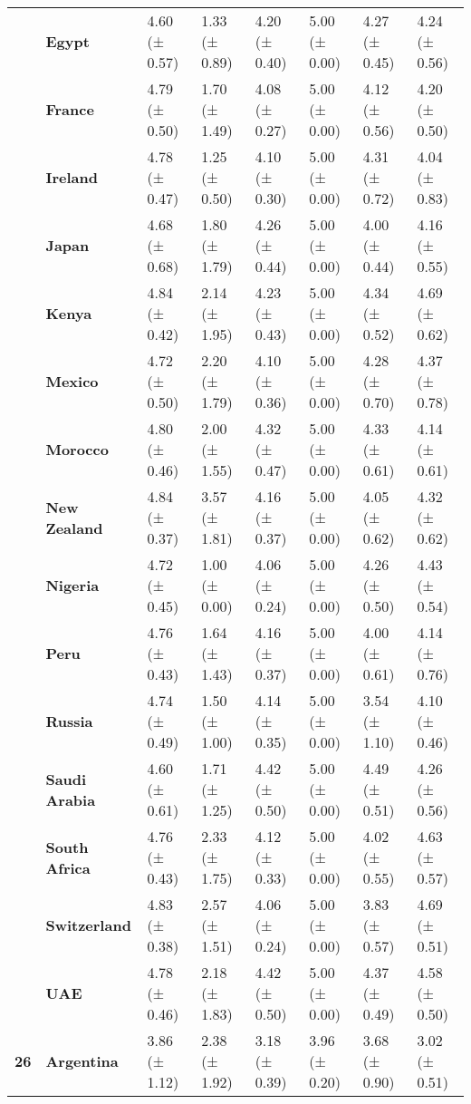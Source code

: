 \begin{longtable}{llllllll}
\textbf{} & \textbf{Egypt} & 4.60 (± 0.57) & 1.33 (± 0.89) & 4.20 (± 0.40) & 5.00 (± 0.00) & 4.27 (± 0.45) & 4.24 (± 0.56) \\
\textbf{} & \textbf{France} & 4.79 (± 0.50) & 1.70 (± 1.49) & 4.08 (± 0.27) & 5.00 (± 0.00) & 4.12 (± 0.56) & 4.20 (± 0.50) \\
\textbf{} & \textbf{Ireland} & 4.78 (± 0.47) & 1.25 (± 0.50) & 4.10 (± 0.30) & 5.00 (± 0.00) & 4.31 (± 0.72) & 4.04 (± 0.83) \\
\textbf{} & \textbf{Japan} & 4.68 (± 0.68) & 1.80 (± 1.79) & 4.26 (± 0.44) & 5.00 (± 0.00) & 4.00 (± 0.44) & 4.16 (± 0.55) \\
\textbf{} & \textbf{Kenya} & 4.84 (± 0.42) & 2.14 (± 1.95) & 4.23 (± 0.43) & 5.00 (± 0.00) & 4.34 (± 0.52) & 4.69 (± 0.62) \\
\textbf{} & \textbf{Mexico} & 4.72 (± 0.50) & 2.20 (± 1.79) & 4.10 (± 0.36) & 5.00 (± 0.00) & 4.28 (± 0.70) & 4.37 (± 0.78) \\
\textbf{} & \textbf{Morocco} & 4.80 (± 0.46) & 2.00 (± 1.55) & 4.32 (± 0.47) & 5.00 (± 0.00) & 4.33 (± 0.61) & 4.14 (± 0.61) \\
\textbf{} & \textbf{New Zealand} & 4.84 (± 0.37) & 3.57 (± 1.81) & 4.16 (± 0.37) & 5.00 (± 0.00) & 4.05 (± 0.62) & 4.32 (± 0.62) \\
\textbf{} & \textbf{Nigeria} & 4.72 (± 0.45) & 1.00 (± 0.00) & 4.06 (± 0.24) & 5.00 (± 0.00) & 4.26 (± 0.50) & 4.43 (± 0.54) \\
\textbf{} & \textbf{Peru} & 4.76 (± 0.43) & 1.64 (± 1.43) & 4.16 (± 0.37) & 5.00 (± 0.00) & 4.00 (± 0.61) & 4.14 (± 0.76) \\
\textbf{} & \textbf{Russia} & 4.74 (± 0.49) & 1.50 (± 1.00) & 4.14 (± 0.35) & 5.00 (± 0.00) & 3.54 (± 1.10) & 4.10 (± 0.46) \\
\textbf{} & \textbf{Saudi Arabia} & 4.60 (± 0.61) & 1.71 (± 1.25) & 4.42 (± 0.50) & 5.00 (± 0.00) & 4.49 (± 0.51) & 4.26 (± 0.56) \\
\textbf{} & \textbf{South Africa} & 4.76 (± 0.43) & 2.33 (± 1.75) & 4.12 (± 0.33) & 5.00 (± 0.00) & 4.02 (± 0.55) & 4.63 (± 0.57) \\
\textbf{} & \textbf{Switzerland} & 4.83 (± 0.38) & 2.57 (± 1.51) & 4.06 (± 0.24) & 5.00 (± 0.00) & 3.83 (± 0.57) & 4.69 (± 0.51) \\
\textbf{} & \textbf{UAE} & 4.78 (± 0.46) & 2.18 (± 1.83) & 4.42 (± 0.50) & 5.00 (± 0.00) & 4.37 (± 0.49) & 4.58 (± 0.50) \\
\cline{1-8}
\multirow[t]{19}{*}{\textbf{26}} & \textbf{Argentina} & 3.86 (± 1.12) & 2.38 (± 1.92) & 3.18 (± 0.39) & 3.96 (± 0.20) & 3.68 (± 0.90) & 3.02 (± 0.51) \\

\end{longtable}
